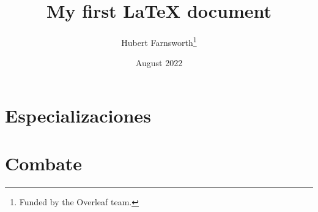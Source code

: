 \documentclass[12pt, letterpaper]{book}
\title{My first LaTeX document}
\author{Hubert Farnsworth\thanks{Funded by the Overleaf team.}}
\date{August 2022}
\begin{document}
\maketitle

\chapter{Especializaciones}

\chapter{Combate}



\end{document}
